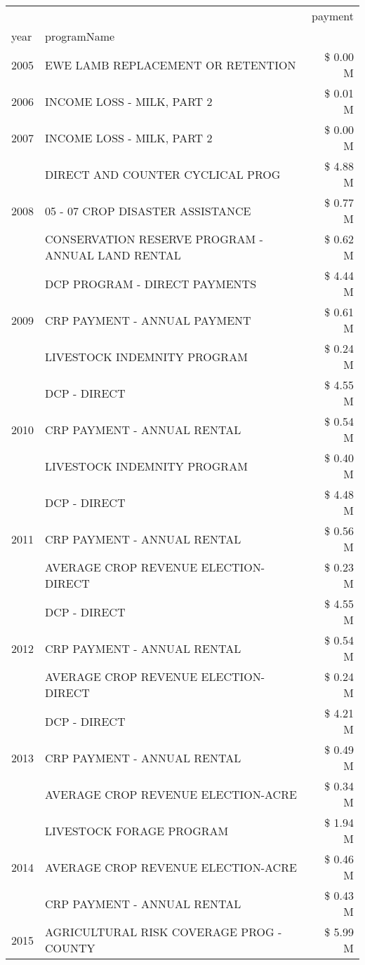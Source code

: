 \begin{tabular}{llr}
\toprule
 &  & payment \\
year & programName &  \\
\midrule
2005 & EWE LAMB REPLACEMENT OR RETENTION & \$ 0.00 M \\
\cline{1-3}
2006 & INCOME LOSS - MILK, PART 2 & \$ 0.01 M \\
\cline{1-3}
2007 & INCOME LOSS - MILK, PART 2 & \$ 0.00 M \\
\cline{1-3}
\multirow[t]{3}{*}{2008} & DIRECT AND COUNTER CYCLICAL PROG & \$ 4.88 M \\
 & 05 - 07 CROP DISASTER ASSISTANCE & \$ 0.77 M \\
 & CONSERVATION RESERVE PROGRAM - ANNUAL LAND RENTAL & \$ 0.62 M \\
\cline{1-3}
\multirow[t]{3}{*}{2009} & DCP PROGRAM - DIRECT PAYMENTS & \$ 4.44 M \\
 & CRP PAYMENT - ANNUAL PAYMENT & \$ 0.61 M \\
 & LIVESTOCK INDEMNITY PROGRAM & \$ 0.24 M \\
\cline{1-3}
\multirow[t]{3}{*}{2010} & DCP - DIRECT & \$ 4.55 M \\
 & CRP PAYMENT - ANNUAL RENTAL & \$ 0.54 M \\
 & LIVESTOCK INDEMNITY PROGRAM & \$ 0.40 M \\
\cline{1-3}
\multirow[t]{3}{*}{2011} & DCP - DIRECT & \$ 4.48 M \\
 & CRP PAYMENT - ANNUAL RENTAL & \$ 0.56 M \\
 & AVERAGE CROP REVENUE ELECTION-DIRECT & \$ 0.23 M \\
\cline{1-3}
\multirow[t]{3}{*}{2012} & DCP - DIRECT & \$ 4.55 M \\
 & CRP PAYMENT - ANNUAL RENTAL & \$ 0.54 M \\
 & AVERAGE CROP REVENUE ELECTION-DIRECT & \$ 0.24 M \\
\cline{1-3}
\multirow[t]{3}{*}{2013} & DCP - DIRECT & \$ 4.21 M \\
 & CRP PAYMENT - ANNUAL RENTAL & \$ 0.49 M \\
 & AVERAGE CROP REVENUE ELECTION-ACRE & \$ 0.34 M \\
\cline{1-3}
\multirow[t]{3}{*}{2014} & LIVESTOCK FORAGE PROGRAM & \$ 1.94 M \\
 & AVERAGE CROP REVENUE ELECTION-ACRE & \$ 0.46 M \\
 & CRP PAYMENT - ANNUAL RENTAL & \$ 0.43 M \\
\cline{1-3}
\multirow[t]{3}{*}{2015} & AGRICULTURAL RISK COVERAGE PROG - COUNTY & \$ 5.99 M \\

\end{tabular}
